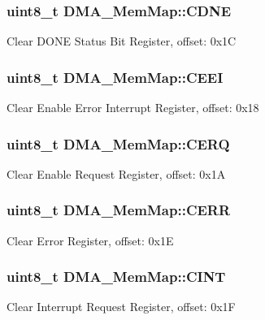 \subsubsection[{C\+D\+N\+E}]{\setlength{\rightskip}{0pt plus 5cm}uint8\+\_\+t D\+M\+A\+\_\+\+Mem\+Map\+::\+C\+D\+N\+E}\label{struct_d_m_a___mem_map_ab41bdc9f4302f141db34641e6cf21e85}
Clear D\+O\+N\+E Status Bit Register, offset\+: 0x1\+C \hypertarget{struct_d_m_a___mem_map_a02b835eb33ce21b8b3170304a72fccc2}{}
\subsubsection[{C\+E\+E\+I}]{\setlength{\rightskip}{0pt plus 5cm}uint8\+\_\+t D\+M\+A\+\_\+\+Mem\+Map\+::\+C\+E\+E\+I}\label{struct_d_m_a___mem_map_a02b835eb33ce21b8b3170304a72fccc2}
Clear Enable Error Interrupt Register, offset\+: 0x18 \hypertarget{struct_d_m_a___mem_map_a1e78a98a5a2aca80d229f7c055dc9ff1}{}
\subsubsection[{C\+E\+R\+Q}]{\setlength{\rightskip}{0pt plus 5cm}uint8\+\_\+t D\+M\+A\+\_\+\+Mem\+Map\+::\+C\+E\+R\+Q}\label{struct_d_m_a___mem_map_a1e78a98a5a2aca80d229f7c055dc9ff1}
Clear Enable Request Register, offset\+: 0x1\+A \hypertarget{struct_d_m_a___mem_map_acb163ebc8fa00a1bdc82b3e8324d4b23}{}
\subsubsection[{C\+E\+R\+R}]{\setlength{\rightskip}{0pt plus 5cm}uint8\+\_\+t D\+M\+A\+\_\+\+Mem\+Map\+::\+C\+E\+R\+R}\label{struct_d_m_a___mem_map_acb163ebc8fa00a1bdc82b3e8324d4b23}
Clear Error Register, offset\+: 0x1\+E \hypertarget{struct_d_m_a___mem_map_a1a3708788fc9260a7392a51485629884}{}
\subsubsection[{C\+I\+N\+T}]{\setlength{\rightskip}{0pt plus 5cm}uint8\+\_\+t D\+M\+A\+\_\+\+Mem\+Map\+::\+C\+I\+N\+T}\label{struct_d_m_a___mem_map_a1a3708788fc9260a7392a51485629884}
Clear Interrupt Request Register, offset\+: 0x1\+F \hypertarget{struct_d_m_a___mem_map_a9bb0ed26839d915ea750b157a6f59f7a}{}
